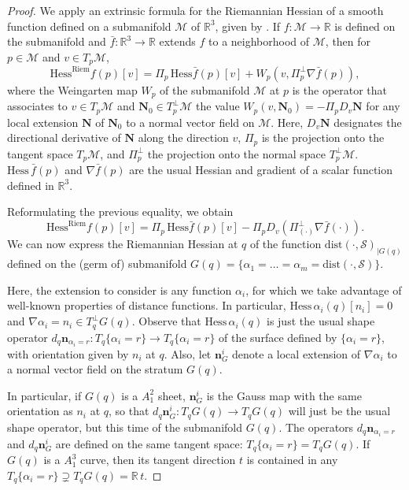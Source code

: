 \documentclass[11pt]{article}
\newcommand{\R}{\mathbb{R}}
\newcommand{\nbf}{\mathbf{n}}
\newcommand{\dist}{\mathrm{dist}}
\newcommand{\Surf}{\mathcal{S}}
\newcommand{\grad}{\nabla}
\newcommand{\Hess}{\mathrm{Hess}}
\theoremstyle{plain}
\theoremstyle{definition}
\theoremstyle{remark}
\begin{document}
\begin{proof}
	
	We apply an extrinsic formula for the Riemannian Hessian of a smooth function defined on a submanifold $\mathcal{M}$ of $\R^3$, given by \cite{absil_extrinsic_2013}. If $f : \mathcal{M} \to \R$ is defined on the submanifold and $\bar{f} : \R^3 \to \R$ extends $f$ to a neighborhood of $\mathcal{M}$, then for $p \in \mathcal{M}$ and $v \in T_p \mathcal{M}$,
	\[\Hess^{\mathrm{Riem}} f(p)[v] = \Pi_p \, \Hess \bar{f}(p)[v] + W_p(v, \Pi_p^\perp \grad \bar{f}(p) ),\]
	where the Weingarten map $W_p$ of the submanifold $\mathcal{M}$ at $p$ is the operator that associates to $v \in T_p \mathcal{M}$ and $ \mathbf{N}_0 \in T_p^\perp \mathcal{M}$ the value $W_p(v, \mathbf{N}_0) = - \Pi_p D_v \mathbf{N}$ for any local extension $\mathbf{N}$ of $\mathbf{N}_0$ to a normal vector field on $\mathcal{M}$. Here, $D_v \mathbf{N}$ designates the directional derivative of $\mathbf{N}$ along the direction $v$, $\Pi_p$ is the projection onto the tangent space $T_p \mathcal{M}$, and $\Pi_p^\perp$ the projection onto the normal space $T_p^\perp \mathcal{M}$.
	$\Hess \, \bar{f}(p)$ and $\grad \bar{f} (p)$ are the usual Hessian and gradient of a scalar function defined in $\R^3$.
	
	Reformulating the previous equality, we obtain
	\[\Hess^{\mathrm{Riem}} f(p)[v] = \Pi_p \, \Hess \bar{f}(p)[v] - 
	\Pi_p D_v (\Pi_{(\cdot)}^\perp \grad \bar{f}(\cdot)).\]
	We can now express the Riemannian Hessian at $q$ of the function $\dist(\cdot, \Surf)_{|G(q)}$ defined on the (germ of) submanifold $G(q) = \{\alpha_1 = \ldots = \alpha_m = \dist(\cdot, \Surf)\}$. 
	
	Here, the extension to consider is any function $\alpha_i$, for which we take advantage of well-known properties of distance functions.
	In particular, $\Hess \, \alpha_i(q) [n_i] = 0$ and $\grad \alpha_i = n_i \in T_q^\perp G(q)$.  Observe that $\Hess \, \alpha_i(q)$ is just the usual shape operator $d_q \nbf_{\alpha_i = r} : T_q \{\alpha_i = r\} \to T_q \{\alpha_i = r\}$ of the surface defined by $\{\alpha_i = r\}$, with orientation given by $n_i$ at $q$.
	Also, let $\nbf^i_G$ denote a local extension of $\grad \alpha_i$ to a normal vector field on the stratum $G(q)$. 
	
	In particular, if $G(q)$ is a $A_1^2$ sheet, $\nbf^i_G$ is the Gauss map with the same orientation as $n_i$ at $q$, so that $d_q \nbf^i_G : T_q G(q) \to T_q G(q)$ will just be the usual shape operator, but this time of the submanifold $G(q)$. The operators  $d_q \nbf_{\alpha_i = r}$ and $d_q \nbf^i_G$ are defined on the same tangent space: $T_q \{\alpha_i = r\} = T_q G(q)$.
	If $G(q)$ is a $A_1^3$ curve, then its tangent direction $t$ is contained in any $T_q \{\alpha_i = r\} \supsetneq T_q G(q) = \R\, t$.
	

\end{proof}
\end{document}
